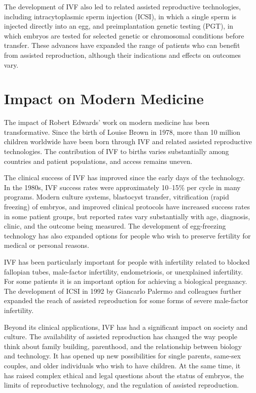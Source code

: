 The development of IVF also led to related assisted reproductive technologies, including intracytoplasmic sperm injection (ICSI), in which a single sperm is injected directly into an egg, and preimplantation genetic testing (PGT), in which embryos are tested for selected genetic or chromosomal conditions before transfer. These advances have expanded the range of patients who can benefit from assisted reproduction, although their indications and effects on outcomes vary.

\section{Impact on Modern Medicine}

The impact of Robert Edwards' work on modern medicine has been transformative. Since the birth of Louise Brown in 1978, more than 10 million children worldwide have been born through IVF and related assisted reproductive technologies. The contribution of IVF to births varies substantially among countries and patient populations, and access remains uneven.

The clinical success of IVF has improved since the early days of the technology. In the 1980s, IVF success rates were approximately 10--15\% per cycle in many programs. Modern culture systems, blastocyst transfer, vitrification (rapid freezing) of embryos, and improved clinical protocols have increased success rates in some patient groups, but reported rates vary substantially with age, diagnosis, clinic, and the outcome being measured. The development of egg-freezing technology has also expanded options for people who wish to preserve fertility for medical or personal reasons.

IVF has been particularly important for people with infertility related to blocked fallopian tubes, male-factor infertility, endometriosis, or unexplained infertility. For some patients it is an important option for achieving a biological pregnancy. The development of ICSI in 1992 by Giancarlo Palermo and colleagues further expanded the reach of assisted reproduction for some forms of severe male-factor infertility.

Beyond its clinical applications, IVF has had a significant impact on society and culture. The availability of assisted reproduction has changed the way people think about family building, parenthood, and the relationship between biology and technology. It has opened up new possibilities for single parents, same-sex couples, and older individuals who wish to have children. At the same time, it has raised complex ethical and legal questions about the status of embryos, the limits of reproductive technology, and the regulation of assisted reproduction.

